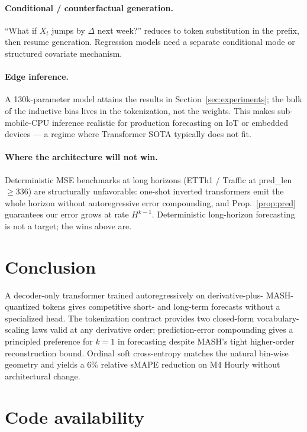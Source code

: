 \documentclass[11pt]{article}
\theoremstyle{remark}
\begin{document}
\paragraph{Conditional / counterfactual generation.}
``What if $X_t$ jumps by $\Delta$ next week?'' reduces to token
substitution in the prefix, then resume generation. Regression models
need a separate conditional mode or structured covariate mechanism.

\paragraph{Edge inference.}
A 130k-parameter model attains the results in Section~\ref{sec:experiments};
the bulk of the inductive bias lives in the tokenization, not the
weights. This makes sub-mobile-CPU inference realistic for production
forecasting on IoT or embedded devices --- a regime where Transformer
SOTA typically does not fit.

\paragraph{Where the architecture will not win.}
Deterministic MSE benchmarks at long horizons (ETTh1 / Traffic at
pred\_len $\ge 336$) are structurally unfavorable: one-shot inverted
transformers emit the whole horizon without autoregressive error
compounding, and Prop.~\ref{prop:pred} guarantees our error grows at
rate $H^{k-1}$. Deterministic long-horizon forecasting is not a
target; the wins above are.

\section{Conclusion}

A decoder-only transformer trained autoregressively on derivative-plus-
MASH-quantized tokens gives competitive short- and long-term forecasts
without a specialized head. The tokenization contract provides two
closed-form vocabulary-scaling laws valid at any derivative order;
prediction-error compounding gives a principled preference for $k=1$
in forecasting despite MASH's tight higher-order reconstruction
bound. Ordinal soft cross-entropy matches the natural bin-wise geometry
and yields a 6\% relative sMAPE reduction on M4 Hourly without
architectural change.

\section*{Code availability}
\end{document}
